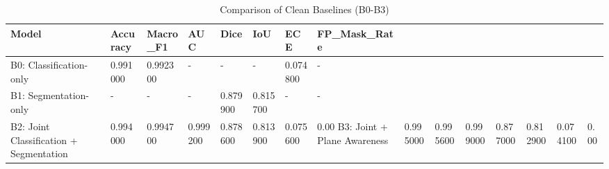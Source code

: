 \begin{table}
\caption{Comparison of Clean Baselines (B0-B3)}
\label{tab:clean_baselines}
\begin{tabular}{llllllll}
\toprule
Model & Accuracy & Macro_F1 & AUC & Dice & IoU & ECE & FP_Mask_Rate \\
\midrule
B0: Classification-only & 0.991000 & 0.992300 & - & - & - & 0.074800 & - \\
B1: Segmentation-only & - & - & - & 0.879900 & 0.815700 & - & - \\
B2: Joint Classification + Segmentation & 0.994000 & 0.994700 & 0.999200 & 0.878600 & 0.813900 & 0.075600 & 0.00%
B3: Joint + Plane Awareness & 0.995000 & 0.995600 & 0.999000 & 0.877000 & 0.812900 & 0.074100 & 0.00%
\bottomrule
\end{tabular}
\end{table}

